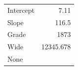 \documentclass{article}
\begin{document}
\begin{tabular}{|l|D{.}{.}{3.2}|}
\hline
Intercept & 7.11 \\
Slope & 116.5 \\
Grade & 1873 \\
Wide & 12345.678 \\
None & \\
\hline
\end{tabular}
\end{document}
